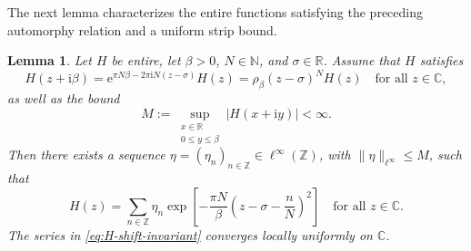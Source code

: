 \documentclass[11pt]{amsart}
\numberwithin{equation}{section}
\newtheorem{lemma}[theorem]{Lemma}
\theoremstyle{definition}
\theoremstyle{remark}
\newcommand{\R}{\mathbb R}
\newcommand{\C}{\mathbb C}
\newcommand{\Z}{\mathbb Z}
\newcommand{\N}{\mathbb N}
\newcommand{\ii}{\mathrm i}
\newcommand{\e}{\mathrm e}
\begin{document}
The next lemma characterizes the entire functions satisfying the preceding automorphy relation and a uniform strip bound.
\begin{lemma}\label{lem:automorphy-shift-invariant}
    Let $H$ be entire, let $\beta>0$, $N \in \N$, and $\sigma\in\R$. Assume that $H$ satisfies
    \begin{equation}\label{eq:H-automorphy}
        H(z+\ii\beta)
        =\e^{\pi N\beta-2\pi\ii N(z-\sigma)}H(z)
        = \rho_\beta(z-\sigma)^N H(z)
        \quad\text{for all }z\in\C,
    \end{equation}
    as well as the bound
    \begin{equation}\label{eq:H-strip-bound}
        M:=\sup_{\substack{x\in\R\\0\leq y\leq\beta}}|H(x+\ii y)|<\infty.
    \end{equation}
    Then there exists a sequence $\eta=(\eta_n)_{n\in\Z}\in\ell^\infty(\Z)$, with $\|\eta\|_{\ell^\infty} \leq M$, such that
    \begin{equation}\label{eq:H-shift-invariant}
        H(z)=\sum_{n\in\Z}\eta_n
        \exp\left[-\frac{\pi N}{\beta}
        \left(z-\sigma-\frac nN\right)^2\right]
        \quad\text{for all }z\in\C.
    \end{equation}
    The series in \eqref{eq:H-shift-invariant} converges locally uniformly on $\C$.
\end{lemma}

\end{document}
